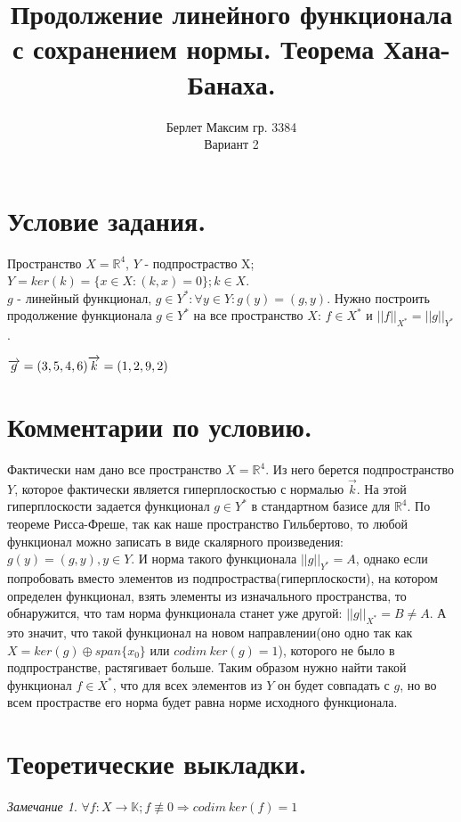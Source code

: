 \documentclass[a4paper, 12pt]{article}
\title{\textbf{Продолжение линейного функционала с сохранением нормы. Теорема Хана-Банаха.}}
\author{Берлет Максим гр. 3384 \\ Вариант 2}
\date{}
\theoremstyle{plain}
\theoremstyle{definition}
\theoremstyle{remark}
\newtheorem{remark}{Замечание}
\begin{document}
\maketitle
\pagebreak

\tableofcontents
\pagebreak

\section{Условие задания.}
Пространство $X = \mathbb{R}^4$, $Y$ - подпростраство X; $Y = ker(k) = \{x \in X: (k, x) = 0\}; k \in X$. 
$g \text{ - линейный функционал, } g \in Y^*: \forall y \in Y: g(y) = (g, y)$. 
Нужно построить продолжение функционала $g \in Y^*$ на все пространство $X$: $f \in X^*$ и $||f||_{X^*} = ||g||_{Y^*}$.


\noindent $\overrightarrow{g} = (3, 5, 4, 6) \\ \overrightarrow{k} = (1, 2, 9, 2)$
\section{Комментарии по условию.}
Фактически нам дано все пространство $X = \mathbb{R}^4$. Из него берется подпространство $Y$, которое фактически является гиперплоскостью с нормалью $\overrightarrow{k}$. На этой гиперплоскости задается функционал $g \in Y^*$ в стандартном базисе для $\mathbb{R}^4$.
По теореме Рисса-Фреше, так как наше пространство Гильбертово, то любой функционал можно записать в виде скалярного произведения: $g(y) = (g, y), y \in Y$.
И норма такого функционала $||g||_{Y^*} = A$, однако если попробовать вместо элементов из подпростраства(гиперплоскости), на котором определен функционал, взять элементы из изначального пространства, то обнаружится, что там норма функционала станет уже другой: $||g||_{X^*} = B \ne A$.
А это значит, что такой функционал на новом направлении(оно одно так как $X = ker(g) \oplus span\{x_0\}$ или $codim \ ker(g) = 1$), которого не было в подпространстве, растягивает больше.
Таким образом нужно найти такой функционал $f \in X^*$, что для всех элементов из $Y$ он будет совпадать с $g$, но во всем прострастве его норма будет равна норме исходного функционала.

\section{Теоретические выкладки.}
\begin{remark}

    $\forall f : X \rightarrow \mathbb{K}; f \not\equiv 0 \Rightarrow codim \ ker(f) = 1$

\end{remark}
\end{document}
